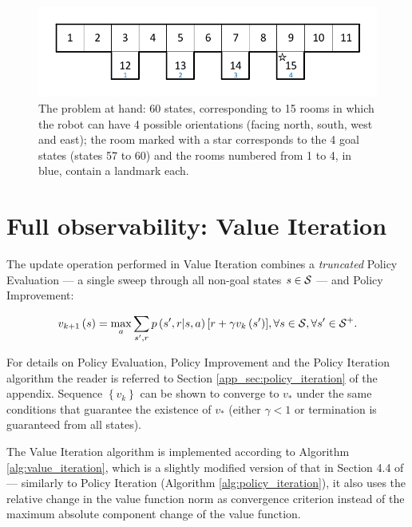 \documentclass[a4paper]{article}
\begin{document}
\begin{figure}[htbp]
\centering
\includegraphics[width=\linewidth]{figures/problem.pdf}
\caption{The problem at hand: 60 states, corresponding to 15 rooms in which the robot can have 4 possible orientations (facing north, south, west and east); the room marked with a star corresponds to the 4 goal states (states 57 to 60) and the rooms numbered from 1 to 4, in blue, contain a landmark each.}
\label{fig:problem}
\end{figure}

\section{Full observability: Value Iteration}

The update operation performed in Value Iteration combines a \textit{truncated} Policy Evaluation --- a single sweep through all non-goal states $s \in \cal{S}$ --- and Policy Improvement:

\begin{align}
v_{k+1}\left( s \right) = \max_{a} \sum\limits_{s',r} { p\left( {s',r|s,a} \right) \left[ r + \gamma v_{k}\left( s' \right) \right] }, \forall s \in {\cal S}, \forall s' \in {\cal S}^{+}.
\end{align}

For details on Policy Evaluation, Policy Improvement and the Policy Iteration algorithm the reader is referred to Section \ref{app_sec:policy_iteration} of the appendix. Sequence $\left\{ v_k \right\}$ can be shown to converge to $v_{*}$ under the same conditions that guarantee the existence of $v_{*}$ (either $\gamma < 1$ or termination is guaranteed from all states).

The Value Iteration algorithm is implemented according to Algorithm \ref{alg:value_iteration}, which is a slightly modified version of that in Section 4.4 of \cite{10.5555/3312046} --- similarly to Policy Iteration (Algorithm \ref{alg:policy_iteration}), it also uses the relative change in the value function norm as convergence criterion instead of the maximum absolute component change of the value function.
\end{document}
